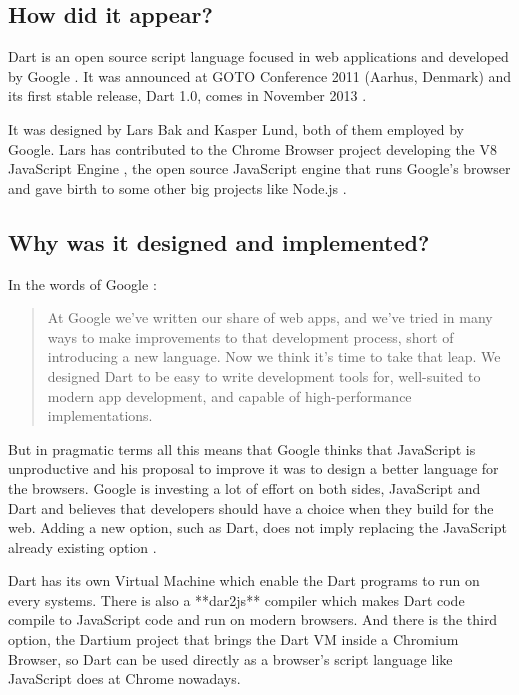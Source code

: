 \subsection{How did it appear?}

Dart is an open source script language focused in web applications and developed
by Google \cite{3_1}. It was announced at GOTO Conference 2011 (Aarhus, Denmark)
\cite{3_2} and its first stable release, Dart 1.0, comes in November 2013
\cite{3_3}.

It was designed by Lars Bak and Kasper Lund, both of them employed by Google.
Lars has contributed to the Chrome Browser project developing the V8 JavaScript
Engine \cite{3_4}, the open source JavaScript
engine that runs Google's browser and gave birth to some other big projects like
Node.js \cite{3_5}.

\subsection{Why was it designed and implemented?}

In the words of Google \cite{3_6}:

\begin{quotation}
At Google we’ve written our share of web apps, and we’ve tried in many ways to
make improvements to that development process, short of introducing a new
language. Now we think it’s time to take that leap. We designed Dart to be
easy to write development tools for, well-suited to modern app development,
and capable of high-performance implementations.
\end{quotation}


But in pragmatic terms all this means that Google thinks that JavaScript is
unproductive and his proposal to improve it was to design a better language for
the browsers. Google is investing a lot of effort on both sides, JavaScript
and Dart \cite{3_7} and believes that developers
should have a choice when they build for the web. Adding a new option, such as
Dart, does not imply replacing the JavaScript already existing 
option \cite{3_8}.

Dart has its own Virtual Machine which enable the Dart programs to run on every
systems. There is also a **dar2js** compiler which makes Dart code compile to
JavaScript code and run on modern browsers. And there is the third option, the
Dartium \cite{3_9} project that brings the Dart VM
inside a Chromium Browser, so Dart can be used directly as a browser's script
language like JavaScript does at Chrome nowadays.

